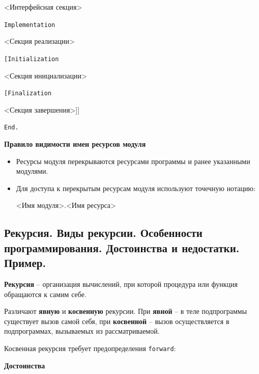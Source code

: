        <Интерфейсная секция>

{\tt Implementation}

       <Секция реализации>

{\tt [Initialization}

       <Секция инициализации>

{\tt [Finalization}

       <Секция завершения>]]
       
{\tt End. }

\noindent
{\bf Правило видимости имен ресурсов модуля}

\begin{itemize}
\item Ресурсы модуля перекрываются ресурсами программы и ранее указанными модулями.

\item Для доступа к перекрытым ресурсам модуля используют точечную нотацию: 

	<Имя модуля>.<Имя ресурса>

\end{itemize}





\newpage\subsection{Рекурсия.  Виды  рекурсии.  Особенности  программирования. Достоинства  и  недостатки. 
Пример. }

\begin{myquote}
            
\end{myquote}


{\bf Рекурсия} – организация вычислений, при которой процедура или функция обращаются к самим себе.

Различают {\bf явную} и {\bf косвенную} рекурсии. При {\bf{явной}} – в теле подпрограммы существует вызов самой себя, при {\bf{косвенной}} – вызов осуществляется в подпрограммах, вызываемых из рассматриваемой.

\noindent
Косвенная рекурсия требует предопределения \texttt{forward}:


\noindent
{\bf Достоинства} 

